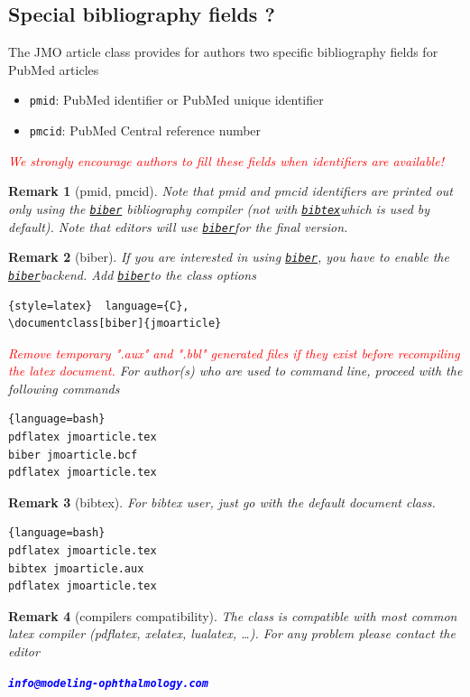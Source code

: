\documentclass{jmoarticle}
\newtheorem*{remark}{Remark}
\def\biber{\href{https://www.ctan.org/tex-archive/biblio/biber}{\lstinline{biber}}\space}
\def\bibtex{\href{https://www.ctan.org/pkg/bibtex}{\lstinline{bibtex}}\space}
\begin{document}
\subsection{Special bibliography fields ?}

The JMO article class provides for authors two specific bibliography fields
for PubMed articles
%
\begin{itemize}
    \item \lstinline{pmid}: PubMed identifier or PubMed unique identifier
    \item \lstinline{pmcid}: PubMed Central reference number
\end{itemize}
%
\textcolor{red}{\textit{We strongly encourage authors to fill these fields when
identifiers are available!}}


\begin{remark}[pmid, pmcid]
Note that pmid and pmcid identifiers are printed out only using
the \biber
bibliography compiler
(not with \bibtex which is used by default).
Note that editors will use \biber for the final version.
\end{remark}

\begin{remark}[biber]
If you are interested in using \biber, you have to enable
the \biber backend. Add \biber to the class options
%
\begin{lstlisting}{style=latex}  language={C},
\documentclass[biber]{jmoarticle}
\end{lstlisting}
%
\textcolor{red}{Remove temporary ".aux" and ".bbl" generated files if they
exist before recompiling the latex document.}
%
For author(s) who are used to command line, proceed with the following
commands
%
\begin{lstlisting}{language=bash}
pdflatex jmoarticle.tex
biber jmoarticle.bcf
pdflatex jmoarticle.tex
\end{lstlisting}

\end{remark}


\begin{remark}[bibtex]
For bibtex user, just go with the default document class.
%
\begin{lstlisting}{language=bash}
pdflatex jmoarticle.tex
bibtex jmoarticle.aux
pdflatex jmoarticle.tex
\end{lstlisting}
%
\end{remark}

\begin{remark}[compilers compatibility]
The class is compatible with most common latex compiler
(pdflatex, xelatex, lualatex, \ldots). For any problem please contact the editor

\noindent
\begin{center}
\textbf{\textcolor{blue}{
\texttt{info@modeling-ophthalmology.com}
}}
\end{center}
\end{remark}
\end{document}
